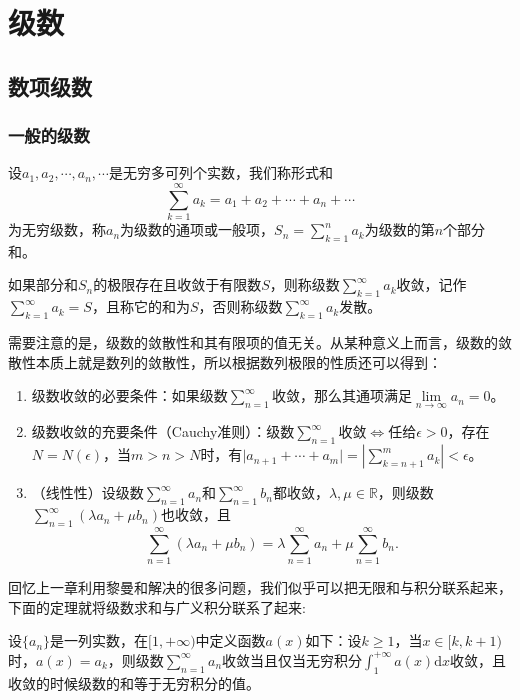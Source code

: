 \chapter{级数}
\section{数项级数}
\subsection{一般的级数}
\begin{definition}[级数]

    设\(a_1,a_2,\cdots,a_n,\cdots\)是无穷多可列个实数，我们称形式和\[\sum_{k=1}^{\infty}a_k=a_1+a_2+\cdots+a_n+\cdots\]为无穷级数，称\(a_n\)为级数的通项或一般项，\(S_n=\sum\limits_{k=1}^{n}a_k\)为级数的第\(n\)个部分和。

    如果部分和\(S_n\)的极限存在且收敛于有限数\(S\)，则称级数\(\sum\limits_{k=1}^{\infty}a_k\)收敛，记作\(\sum\limits_{k=1}^{\infty}a_k=S\)，且称它的和为\(S\)，否则称级数\(\sum\limits_{k=1}^{\infty}a_k\)发散。
\end{definition}

需要注意的是，级数的敛散性和其有限项的值无关。从某种意义上而言，级数的敛散性本质上就是数列的敛散性，所以根据数列极限的性质还可以得到：
\begin{property}
    \begin{enumerate}
        \item 级数收敛的必要条件：如果级数\(\sum\limits_{n=1}^{\infty}\)收敛，那么其通项满足\(\lim\limits_{n\to\infty}a_n=0\)。
        \item 级数收敛的充要条件（Cauchy准则）：级数\(\sum\limits_{n=1}^{\infty}\)收敛\(\iff\)任给\(\epsilon>0\)，存在\(N=N(\epsilon)\)，当\(m>n>N\)时，有\(\vert a_{n+1}+\cdots+a_m\vert=\left|\sum\limits_{k=n+1}^{m}a_k\right|<\epsilon\)。
        \item （线性性）设级数\(\sum\limits_{n=1}^{\infty}a_n\)和\(\sum\limits_{n=1}^{\infty}b_n\)都收敛，\(\lambda,\mu\in\mathbb{R}\)，则级数\(\sum\limits_{n=1}^{\infty}(\lambda a_n+\mu b_n)\)也收敛，且\[\sum_{n=1}^{\infty}(\lambda a_n+\mu b_n)=\lambda\sum_{n=1}^{\infty}a_n+\mu\sum_{n=1}^{\infty}b_n.\]
    \end{enumerate}
\end{property}

回忆上一章利用黎曼和解决的很多问题，我们似乎可以把无限和与积分联系起来，下面的定理就将级数求和与广义积分联系了起来:
\begin{lemma}
    设\(\{a_n\}\)是一列实数，在\([1,+\infty)\)中定义函数\(a(x)\)如下：设\(k\geq1\)，当\(x\in[k,k+1)\)时，\(a(x)=a_k\)，则级数\(\sum\limits_{n=1}^{\infty}a_n\)收敛当且仅当无穷积分\(\displaystyle\int_{1}^{+\infty}a(x)\mathrm{d}x\)收敛，且收敛的时候级数的和等于无穷积分的值。
\end{lemma}\


